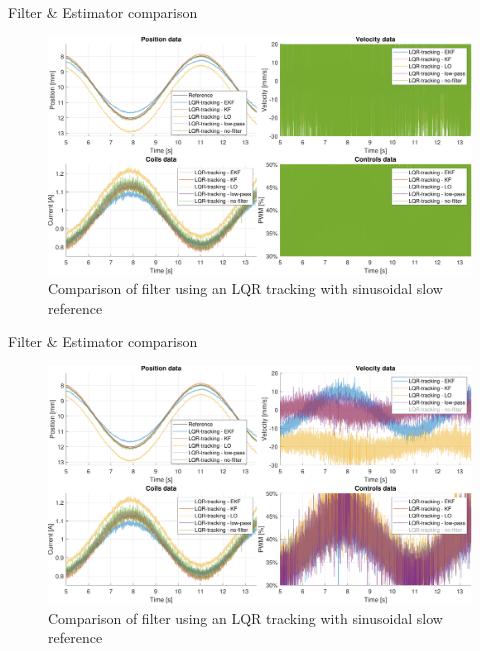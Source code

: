 \begin{frame}{Filter \& Estimator comparison}

    \vspace{9pt}

    \begin{figure}[H]
        \centering
        \includegraphics[width=1\linewidth]{./img/MATLAB/results/sinusoidal_slow_linear_star_star.pdf}
        \caption{Comparison of filter using an LQR tracking with sinusoidal slow reference}
    \end{figure}

\end{frame}

\begin{frame}{Filter \& Estimator comparison}

    \vspace{9pt}

    \begin{figure}[H]
        \centering
        \includegraphics[width=1\linewidth]{./img/MATLAB/results/sinusoidal_slow_linear_star_star_without_nofilter.pdf}
        \caption{Comparison of filter using an LQR tracking with sinusoidal slow reference}
    \end{figure}

\end{frame}



